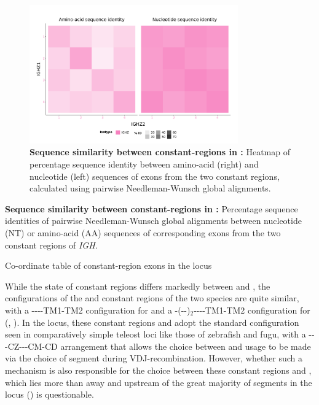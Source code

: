\begin{figure}
	\centering
	\includegraphics[width=0.8\textwidth]{_Figures/png/xma-new-cz-aln}
	\caption[Sequence similarity between  constant-regions in \Xma]{\textbf{Sequence similarity between  constant-regions in \Xma:} Heatmap of percentage sequence identity between amino-acid (right) and nucleotide (left) sequences of \cz{} exons from the two \Xma {} constant regions, calculated using pairwise Needleman-Wunsch global alignments.}
	\label{fig:xma-cz-aln}
\end{figure}

\begin{table}
	\centering
	\caption[Sequence similarity between  constant-regions in \Xma]{\textbf{Sequence similarity between  constant-regions in \Xma:} Percentage sequence identities of pairwise Needleman-Wunsch global alignments between nucleotide (NT) or amino-acid (AA) sequences of corresponding \cz{} exons from the two  constant regions of \Xma \textit{IGH}.}
	
	\label{tab:xma-cz-aln}
\end{table}

\begin{table}\centering
    \caption{Co-ordinate table of constant-region exons in the \xma \igh{} locus}
    	
    \label{tab:xma-ch-coords}
\end{table}

While the state of  constant regions differs markedly between \Xma and \Nfu, the configurations of the  and  constant regions of the two species are quite similar, with a {----TM1-TM2} configuration for  and a {-(--)$_2$----TM1-TM2} configuration for  (, ). In the \Xma locus, these constant regions and  adopt the standard configuration seen in comparatively simple teleost \igh{} loci like those of zebrafish and fugu, with a {\vh-\dh-\jh-CZ-\dh-\jh-CM-CD} arrangement that allows the choice between  and  usage to be made via the choice of \dh segment during VDJ-recombination. However, whether such a mechanism is also responsible for the choice between these constant regions and , which lies more than  away and upstream of the great majority of \vh segments in the locus () is questionable.

